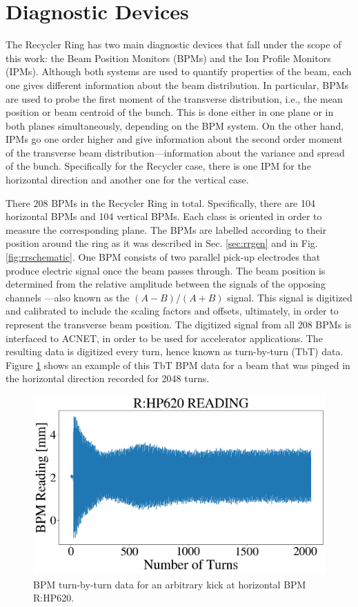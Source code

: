 \section{Diagnostic Devices}

The Recycler Ring has two main diagnostic devices that fall under the scope of this work: the Beam Position Monitors (BPMs) and the Ion Profile Monitors (IPMs). Although both systems are used to quantify properties of the beam, each one gives different information about the beam distribution. In particular, BPMs are used to probe the first moment of the transverse distribution, i.e., the mean position or beam centroid of the bunch. This is done either in one plane or in both planes simultaneously, depending on the BPM system. On the other hand, IPMs go one order higher and give information about the second order moment of the transverse beam distribution---information about the variance and spread of the bunch. Specifically for the Recycler case, there is one IPM for the horizontal direction and another one for the vertical case.

There 208 BPMs in the Recycler Ring in total. Specifically, there are 104 horizontal BPMs and 104 vertical BPMs. Each class is oriented in order to measure the corresponding plane. The BPMs are labelled according to their position around the ring as it was described in Sec. \ref{sec:rrgen} and in Fig. \ref{fig:rrschematic}. One BPM consists of two parallel pick-up electrodes that produce electric signal once the beam passes through. The beam position is determined from the relative amplitude between the signals of the opposing channels \cite{rrbpms}---also known as the $(A-B)/(A+B)$ signal. This signal is digitized and calibrated to include the scaling factors and offsets, ultimately, in order to represent the transverse beam position. The digitized signal from all 208 BPMs is interfaced to ACNET, in order to be used for accelerator applications. The resulting data is digitized every turn, hence known as turn-by-turn (TbT) data. Figure \ref{fig:bpmkick} shows an example of this TbT BPM data for a beam that was pinged in the horizontal direction recorded for 2048 turns.      

\begin{figure}[H]
   \centering
   \includegraphics[width=\columnwidth]{chapter3/bpm_kick.png}
   \caption{BPM turn-by-turn data for an arbitrary kick at horizontal BPM R:HP620.}
   \label{fig:bpmkick}
\end{figure}

